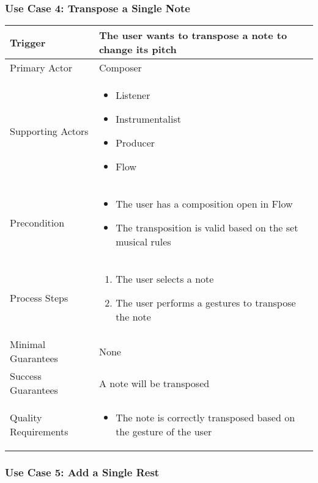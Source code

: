 \subsubsection{Use Case 4: Transpose a Single Note}

\begin{tabularx}{\textwidth}{|X|X|}
\hline
Trigger & 
The user wants to transpose a note to change its pitch \\
\hline
Primary Actor & 
Composer \\
\hline
Supporting Actors & 
\begin{itemize}
\item Listener
\item Instrumentalist
\item Producer
\item Flow
\end{itemize} \\
\hline
Precondition & 
\begin{itemize}
\item The user has a composition open in Flow
\item The transposition is valid based on the set musical rules
\end{itemize} \\
\hline
Process Steps & 
\begin{enumerate}
\item The user selects a note
\item The user performs a gestures to transpose the note
\end{enumerate} \\
\hline
Minimal Guarantees & 
None \\
\hline
Success Guarantees & 
A note will be transposed \\
\hline
Quality Requirements & 
\begin{itemize}
\item The note is correctly transposed based on the gesture of the user
\end{itemize} \\ 
\hline
\end{tabularx}




\subsubsection{Use Case 5: Add a Single Rest}

